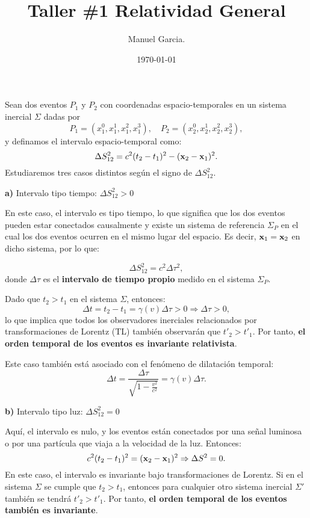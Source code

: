 \documentclass{article}
\title{Taller \#1 Relatividad General}
\author{Manuel Garcia.}
\date{\today}
\begin{document}
\maketitle

\section{}

Sean dos eventos $P_1$ y $P_2$ con coordenadas espacio-temporales en un sistema inercial $\Sigma$ dadas por
\[
P_1 = (x_1^0, x_1^1, x_1^2, x_1^3), \quad P_2 = (x_2^0, x_2^1, x_2^2, x_2^3),
\]
y definamos el intervalo espacio-temporal como:
\[
\Delta S_{12}^2 = c^2(t_2 - t_1)^2 - (\vb{x}_2 - \vb{x}_1)^2.
\]
Estudiaremos tres casos distintos según el signo de $\Delta S_{12}^2$.

\textbf{a)} Intervalo tipo tiempo: $\Delta S_{12}^2 > 0$

En este caso, el intervalo es tipo tiempo, lo que significa que los dos eventos pueden estar conectados causalmente y existe un sistema de referencia $\Sigma_P$ en el cual los dos eventos ocurren en el mismo lugar del espacio. Es decir, $\vb{x}_1 = \vb{x}_2$ en dicho sistema, por lo que:

\[
\Delta S_{12}^2 = c^2 \Delta \tau^2,
\]
donde $\Delta \tau$ es el \textbf{intervalo de tiempo propio} medido en el sistema $\Sigma_P$.

Dado que $t_2 > t_1$ en el sistema $\Sigma$, entonces:
\[
\Delta t = t_2 - t_1 = \gamma(v) \Delta \tau > 0 \Rightarrow \Delta \tau > 0,
\]
lo que implica que todos los observadores inerciales relacionados por transformaciones de Lorentz (TL) también observarán que $t'_2 > t'_1$. Por tanto, \textbf{el orden temporal de los eventos es invariante relativista}.

Este caso también está asociado con el fenómeno de dilatación temporal:
\[
\Delta t = \frac{\Delta \tau}{\sqrt{1 - \frac{v^2}{c^2}}} = \gamma(v)\Delta \tau.
\]

\textbf{b)} Intervalo tipo luz: $\Delta S_{12}^2 = 0$

Aquí, el intervalo es nulo, y los eventos están conectados por una señal luminosa o por una partícula que viaja a la velocidad de la luz. Entonces:
\[
c^2(t_2 - t_1)^2 = (\vb{x}_2 - \vb{x}_1)^2 \Rightarrow \Delta S^2 = 0.
\]
En este caso, el intervalo es invariante bajo transformaciones de Lorentz. Si en el sistema $\Sigma$ se cumple que $t_2 > t_1$, entonces para cualquier otro sistema inercial $\Sigma'$ también se tendrá $t'_2 > t'_1$. Por tanto, \textbf{el orden temporal de los eventos también es invariante}.
\end{document}
